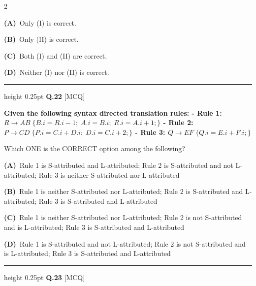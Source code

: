 \documentclass[a4paper,10pt,twoside]{article}
\begin{document}
\begin{multicols}{2}
\par\vspace{2pt}\noindent
\textbf{(A)}~Only (I) is correct.\par\vspace{2pt}\noindent
\textbf{(B)}~Only (II) is correct.\par\vspace{2pt}\noindent
\textbf{(C)}~Both (I) and (II) are correct.\par\vspace{2pt}\noindent
\textbf{(D)}~Neither (I) nor (II) is correct.
\par\vspace{6pt}\hrule height 0.25pt\vspace{6pt}
\noindent\textbf{Q.22} \hfill {\footnotesize\textsf{[MCQ]}}
\par\vspace{2pt}
{\bfseries Given the following syntax directed translation rules:
- Rule 1: $R \to AB \;\{ B.i = R.i - 1; \; A.i = B.i; \; R.i = A.i + 1; \}$
- Rule 2: $P \to CD \;\{ P.i = C.i + D.i; \; D.i = C.i + 2; \}$
- Rule 3: $Q \to EF \;\{ Q.i = E.i + F.i; \}$
\par\smallskip
Which ONE is the CORRECT option among the following? \par}
\par\vspace{2pt}\noindent
\textbf{(A)}~Rule 1 is S-attributed and L-attributed; Rule 2 is S-attributed and not L-attributed; Rule 3 is neither S-attributed nor L-attributed\par\vspace{2pt}\noindent
\textbf{(B)}~Rule 1 is neither S-attributed nor L-attributed; Rule 2 is S-attributed and L-attributed; Rule 3 is S-attributed and L-attributed\par\vspace{2pt}\noindent
\textbf{(C)}~Rule 1 is neither S-attributed nor L-attributed; Rule 2 is not S-attributed and is L-attributed; Rule 3 is S-attributed and L-attributed\par\vspace{2pt}\noindent
\textbf{(D)}~Rule 1 is S-attributed and not L-attributed; Rule 2 is not S-attributed and is L-attributed; Rule 3 is S-attributed and L-attributed
\par\vspace{6pt}\hrule height 0.25pt\vspace{6pt}
\noindent\textbf{Q.23} \hfill {\footnotesize\textsf{[MCQ]}}
\par\vspace{2pt}

\end{multicols}
\end{document}
